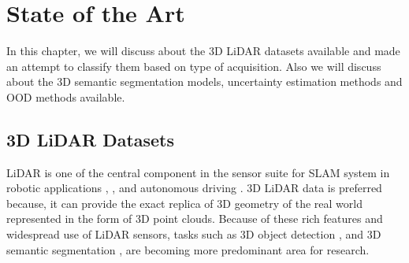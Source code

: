 

    \chapter{State of the Art}
    In this chapter, we will discuss about the 3D LiDAR datasets available and made an attempt to classify them based on type of acquisition.
    Also we will discuss about the 3D semantic segmentation models, uncertainty estimation methods and OOD methods available.
    \section{3D LiDAR Datasets}
    LiDAR is one of the central component in the sensor suite for SLAM system in robotic applications \cite{thrun2006stanley}, \cite{patz2008practical}, \cite{hess20162dSLAM} and autonomous driving \cite{li2016vehicle}.
    3D LiDAR data is preferred because, it can provide the exact replica of 3D geometry of the real world represented in the form of 3D point clouds.
    Because of these rich features and widespread use of LiDAR sensors, tasks such as 3D object detection \cite{zhou2018voxelnet}, \cite{PIXOR} and 3D semantic segmentation \cite{qi2017pointnet++}, \cite{3Dmininet} are becoming more predominant area for research.
    

